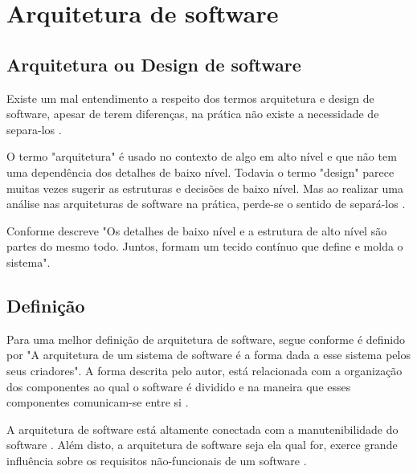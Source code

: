 \section{Arquitetura de software}
    
    \subsection{Arquitetura ou Design de software}
    
        \par Existe um mal entendimento a respeito dos termos arquitetura e design de software, apesar de terem diferenças, na prática não existe a necessidade de separa-los \cite{livro:martin:cleanarch}.
        
        \par O termo "arquitetura"\hspace{0.1cm} é usado no contexto de algo em alto nível e que não tem uma dependência dos detalhes de baixo nível. Todavia o termo "design"\hspace{0.1cm} parece muitas vezes sugerir as estruturas e decisões de baixo nível. Mas ao realizar uma análise nas arquiteturas de software na prática, perde-se o sentido de separá-los \cite{livro:martin:cleanarch}.
    
        \par Conforme descreve  "Os detalhes de baixo nível e a estrutura de alto nível são partes do mesmo todo. Juntos, formam um tecido contínuo que define e molda o sistema".
        
        
    \subsection{Definição}
    
        \par Para uma melhor definição de arquitetura de software, segue conforme é definido por  "A arquitetura de um sistema de software é a forma dada a esse sistema pelos seus criadores". A forma descrita pelo autor, está relacionada com a organização dos componentes ao qual o software é dividido e na maneira que esses componentes comunicam-se entre si \cite{livro:martin:cleanarch}.
        
        \par A arquitetura de software está altamente conectada com a manutenibilidade do software \cite{artigo:dantas:2021}. Além disto, a arquitetura de software seja ela qual for, exerce grande influência sobre os requisitos não-funcionais de um software \cite{artigo:lopes:2021}.
    
